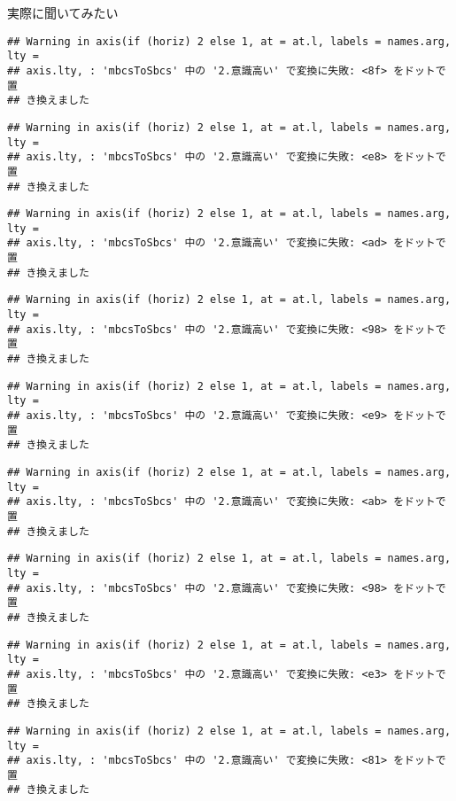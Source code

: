 \documentclass[ignorenonframetext,]{beamer}
\begin{document}
\begin{frame}[fragile]{実際に聞いてみたい}
\begin{verbatim}
## Warning in axis(if (horiz) 2 else 1, at = at.l, labels = names.arg, lty =
## axis.lty, : 'mbcsToSbcs' 中の '2.意識高い' で変換に失敗: <8f> をドットで置
## き換えました
\end{verbatim}

\begin{verbatim}
## Warning in axis(if (horiz) 2 else 1, at = at.l, labels = names.arg, lty =
## axis.lty, : 'mbcsToSbcs' 中の '2.意識高い' で変換に失敗: <e8> をドットで置
## き換えました
\end{verbatim}

\begin{verbatim}
## Warning in axis(if (horiz) 2 else 1, at = at.l, labels = names.arg, lty =
## axis.lty, : 'mbcsToSbcs' 中の '2.意識高い' で変換に失敗: <ad> をドットで置
## き換えました
\end{verbatim}

\begin{verbatim}
## Warning in axis(if (horiz) 2 else 1, at = at.l, labels = names.arg, lty =
## axis.lty, : 'mbcsToSbcs' 中の '2.意識高い' で変換に失敗: <98> をドットで置
## き換えました
\end{verbatim}

\begin{verbatim}
## Warning in axis(if (horiz) 2 else 1, at = at.l, labels = names.arg, lty =
## axis.lty, : 'mbcsToSbcs' 中の '2.意識高い' で変換に失敗: <e9> をドットで置
## き換えました
\end{verbatim}

\begin{verbatim}
## Warning in axis(if (horiz) 2 else 1, at = at.l, labels = names.arg, lty =
## axis.lty, : 'mbcsToSbcs' 中の '2.意識高い' で変換に失敗: <ab> をドットで置
## き換えました
\end{verbatim}

\begin{verbatim}
## Warning in axis(if (horiz) 2 else 1, at = at.l, labels = names.arg, lty =
## axis.lty, : 'mbcsToSbcs' 中の '2.意識高い' で変換に失敗: <98> をドットで置
## き換えました
\end{verbatim}

\begin{verbatim}
## Warning in axis(if (horiz) 2 else 1, at = at.l, labels = names.arg, lty =
## axis.lty, : 'mbcsToSbcs' 中の '2.意識高い' で変換に失敗: <e3> をドットで置
## き換えました
\end{verbatim}

\begin{verbatim}
## Warning in axis(if (horiz) 2 else 1, at = at.l, labels = names.arg, lty =
## axis.lty, : 'mbcsToSbcs' 中の '2.意識高い' で変換に失敗: <81> をドットで置
## き換えました
\end{verbatim}


\end{frame}
\end{document}
